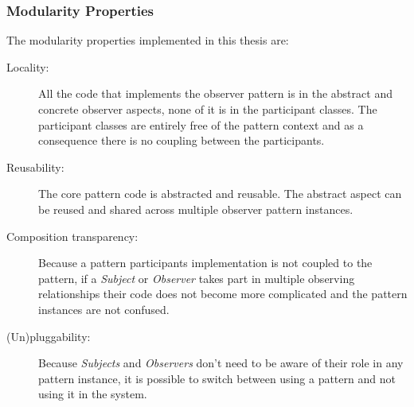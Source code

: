 \subsubsection{Modularity Properties}\label{Modularity Properties}
The modularity properties implemented in this thesis are\cite{hannemann2002design}:

\begin{description}
	\item [Locality:] All the code that implements the observer pattern is in the abstract and concrete observer aspects, none of it is in the participant classes. 
	The participant classes are entirely free of the pattern context and as a consequence there is no coupling between the participants.

	\item [Reusability:] The core pattern code is abstracted and reusable. 
	The abstract aspect can be reused and shared across multiple observer pattern instances.

	\item [Composition transparency:] Because a pattern participants implementation is not coupled to the pattern, if a \textit{Subject} or \textit{Observer} takes part in multiple observing relationships their code does not become more complicated and the pattern instances are not confused. 

	\item [(Un)pluggability:] Because \textit{Subjects} and \textit{Observers} don't need to be aware of their role in any pattern instance, it is possible to switch between using a pattern and not using it in the system. 
\end{description}


